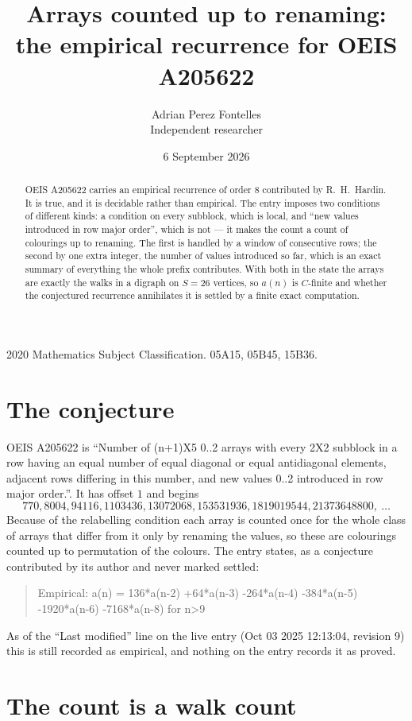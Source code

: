 \documentclass[11pt,a4paper]{article}
\title{Arrays counted up to renaming: the empirical recurrence for OEIS A205622}
\author{Adrian Perez Fontelles\\ \small Independent researcher}
\date{6 September 2026}
\theoremstyle{plain}
\theoremstyle{definition}
\begin{document}
\maketitle

\begin{abstract}
OEIS A205622 carries an empirical recurrence of order $8$ contributed by R.~H.~Hardin. It is
true, and it is decidable rather than empirical. The entry imposes two conditions of different
kinds: a condition on every subblock, which is local, and ``new values introduced in row major
order'', which is not --- it makes the count a count of colourings up to renaming. The first is
handled by a window of consecutive rows; the second by one extra integer, the number of values
introduced so far, which is an exact summary of everything the whole prefix contributes. With
both in the state the arrays are exactly the walks in a digraph on $S=26$ vertices, so $a(n)$
is $C$-finite and whether the conjectured recurrence annihilates it is settled by a finite
exact computation.
\end{abstract}

\noindent\small 2020 Mathematics Subject Classification. 05A15, 05B45, 15B36.\normalsize

\section{The conjecture}

OEIS A205622 is ``Number of (n+1)X5 0..2 arrays with every 2X2 subblock in a row having an equal number of equal diagonal or equal antidiagonal elements, adjacent rows differing in this number, and new values 0..2 introduced in row major order.''. It has offset $1$ and begins
\[
770, 8004, 94116, 1103436, 13072068, 153531936, 1819019544, 21373648800,\ \dots
\]
Because of the relabelling condition each array is counted once for the whole class of arrays that differ from it only by renaming the values, so these are colourings counted up to permutation of the colours.
The entry states, as a conjecture contributed by its author and never marked settled:
\begin{quote}
Empirical: a(n) = 136*a(n-2) +64*a(n-3) -264*a(n-4) -384*a(n-5) -1920*a(n-6) -7168*a(n-8) for n>9
\end{quote}
As of the ``Last modified'' line on the live entry (Oct 03 2025 12:13:04, revision 9) this is still
recorded as empirical, and nothing on the entry records it as proved.

\section{The count is a walk count}
\end{document}
